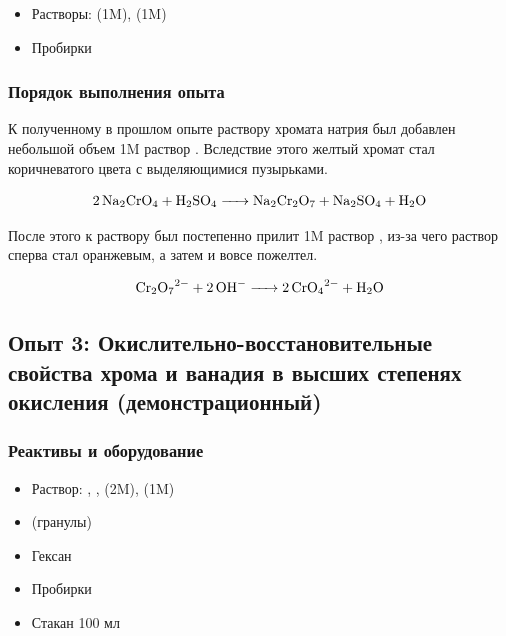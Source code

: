 \documentclass[a4paper, 12pt]{article}
\begin{document}
\begin{itemize}
	\item Растворы:  (1M),  (1M)
	
	\item Пробирки
\end{itemize}

\subsubsection{Порядок выполнения опыта}

К полученному в прошлом опыте раствору хромата натрия был добавлен небольшой объем 1M раствор . Вследствие этого желтый хромат стал коричневатого цвета с выделяющимися пузырьками.

\begin{equation}
	\ce{2Na2CrO4 + H2SO4 -> Na2Cr2O7 + Na2SO4 + H2O}
\end{equation}

После этого к раствору был постепенно прилит 1M раствор , из-за чего раствор сперва стал оранжевым, а затем и вовсе пожелтел.

\begin{equation}
	\ce{Cr2O7^2- + 2OH^- -> 2CrO4^{2-} + H2O}
\end{equation}


\subsection{Опыт 3: Окислительно-восстановительные свойства хрома и ванадия в высших степенях окисления (демонстрационный)}

\subsubsection{Реактивы и оборудование}

\begin{itemize}
	\item Раствор: , ,  (2M),  (1M)
	\item {} (гранулы)
	\item Гексан
	
	\item Пробирки
	\item Стакан 100 мл
\end{itemize}
\end{document}
